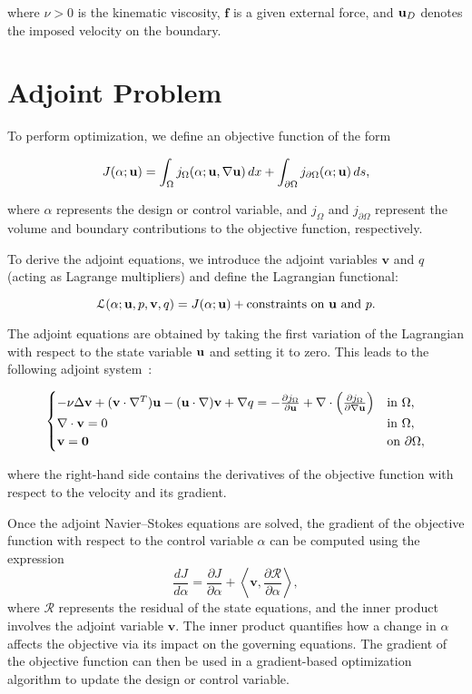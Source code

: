 where $\nu > 0$ is the kinematic viscosity, $\mathbf{f}$ is a given external force, and $\b_u_D$ denotes the imposed velocity on the boundary.

\section{Adjoint Problem}

To perform optimization, we define an objective function of the form

\begin{equation}
J(\alpha; \b_u) = \int_{\Omega} j_{\Omega}(\alpha; \b_u, \nabla \b_u)\, dx + \int_{\partial\Omega} j_{\partial\Omega}(\alpha; \b_u)\, ds,
\end{equation}

where $\alpha$ represents the design or control variable, and $j_{\Omega}$ and $j_{\partial\Omega}$ represent the volume and boundary contributions to the objective function, respectively.

To derive the adjoint equations, we introduce the adjoint variables $\mathbf{v}$ and $q$ (acting as Lagrange multipliers) and define the Lagrangian functional:

\[
\mathcal{L}(\alpha; \b_u, p, \mathbf{v}, q) = J(\alpha; \b_u) + \text{constraints on } \b_u \text{ and } p.
\]

The adjoint equations are obtained by taking the first variation of the Lagrangian with respect to the state variable $\b_u$ and setting it to zero. This leads to the following adjoint system~\cite{galecki2022adjoint}:

\begin{equation}
\begin{cases}
- \nu \Delta \mathbf{v} + (\mathbf{v}  \cdot \nabla^T) \b_u - (\b_u \cdot \nabla) \mathbf{v} + \nabla q = - \frac{\partial j_{\Omega}}{\partial \b_u} + \nabla \cdot \left( \frac{\partial j_{\Omega}}{\partial \nabla \b_u} \right) & \text{in } \Omega, \\
\nabla \cdot \mathbf{v} = 0 & \text{in } \Omega, \\
\mathbf{v} = \mathbf{0} & \text{on } \partial \Omega,
\end{cases}
\label{adjoint}
\end{equation}

where the right-hand side contains the derivatives of the objective function with respect to the velocity and its gradient.

Once the adjoint Navier–Stokes equations are solved, the gradient of the objective function with respect to the control variable $\alpha$ can be computed using the expression
\[
\frac{dJ}{d\alpha} = \frac{\partial J}{\partial \alpha} + \left\langle \mathbf{v}, \frac{\partial \mathcal{R}}{\partial \alpha} \right\rangle,
\]
where $\mathcal{R}$ represents the residual of the state equations, and the inner product involves the adjoint variable $\mathbf{v}$. The inner product quantifies how a change in 
$\alpha$ affects the objective via its impact on the governing equations. The gradient of the objective function can then be used in a gradient-based optimization algorithm to update the design or control variable.


